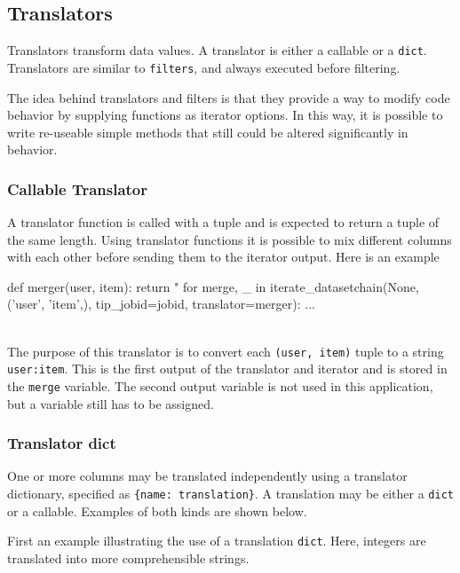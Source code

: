 \subsection{Translators}

Translators transform data values. A translator is either a callable or
a \texttt{dict}.  Translators are similar to \texttt{filters}, and
always executed before filtering.

The idea behind translators and filters is that they provide a way to
modify code behavior by supplying functions as iterator options.  In
this way, it is possible to write re-useable simple methods that still
could be altered significantly in behavior.



\subsubsection*{Callable Translator}

A translator function is called with a tuple and is expected to return
a tuple of the same length.  Using translator functions it is possible
to mix different columns with each other before sending them to the
iterator output.  Here is an example

\begin{python}
def merger(user, item):
    return "%
for merge, _ in iterate_datasetchain(None, ('user', 'item',), tip_jobid=jobid,
                                     translator=merger):
    ...
\end{python}
\\
The purpose of this translator is to convert each
\texttt{(user, item)} tuple to a string \texttt{user:item}.  This is
the first output of the translator and iterator and is stored in the
\texttt{merge} variable.  The second output variable is not used in
this application, but a variable still has to be assigned.



\subsubsection*{Translator dict}

One or more columns may be translated independently using a translator
dictionary, specified as \texttt{\{name:\ translation\}}.  A
translation may be either a \texttt{dict} or a callable.  Examples of
both kinds are shown below.

First an example illustrating the use of a translation \texttt{dict}.
Here, integers are translated into more comprehensible strings.

